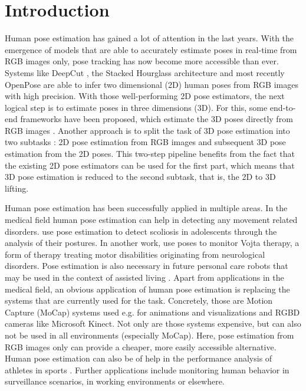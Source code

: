 \section{Introduction}

Human pose estimation has gained a lot of attention in the last years.
With the emergence of models that are able to accurately estimate poses in real-time from RGB images only, pose tracking has now become more accessible than ever.
Systems like DeepCut \cite{pishchulin16}, the Stacked Hourglass architecture \cite{newell16} and most recently OpenPose \cite{cao18} are able to infer two dimensional (2D) human poses from RGB images with high precision.
With those well-performing 2D pose estimators, the next logical step is to estimate poses in three dimensions (3D).
For this, some end-to-end frameworks have been proposed, which estimate the 3D poses directly from RGB images \cite{pavlakos17, park16, mehta17, mehta17_2}.
Another approach is to split the task of 3D pose estimation into two subtasks \cite{drover18, martinez17, moreno-noguer16}:
2D pose estimation from RGB images and subsequent 3D pose estimation from the 2D poses.
This two-step pipeline benefits from the fact that the existing 2D pose estimators can be used for the first part, which means that 3D pose estimation is reduced to the second subtask, that is, the 2D to 3D lifting.

Human pose estimation has been successfully applied in multiple areas.
In the medical field human pose estimation can help in detecting any movement related disorders.
\citet{aroeira16} use pose estimation to detect scoliosis in adolescents through the analysis of their postures.
In another work, \citet{khan18} use poses to monitor Vojta therapy, a form of therapy treating motor disabilities originating from neurological disorders.
Pose estimation is also necessary in future personal care robots that may be used in the context of assisted living \cite{richter15}.
Apart from applications in the medical field, an obvious application of human pose estimation is replacing the systems that are currently used for the task.
Concretely, those are Motion Capture (MoCap) systems used e.g. for animations and visualizations and RGBD cameras like Microsoft Kinect.
Not only are those systems expensive, but can also not be used in all environments (especially MoCap).
Here, pose estimation from RGB images only can provide a cheaper, more easily accessible alternative.
Human pose estimation can also be of help in the performance analysis of athletes in sports \cite{einfalt18, zecha19}.
Further applications include monitoring human behavior in surveillance scenarios, in working environments or elsewhere.

